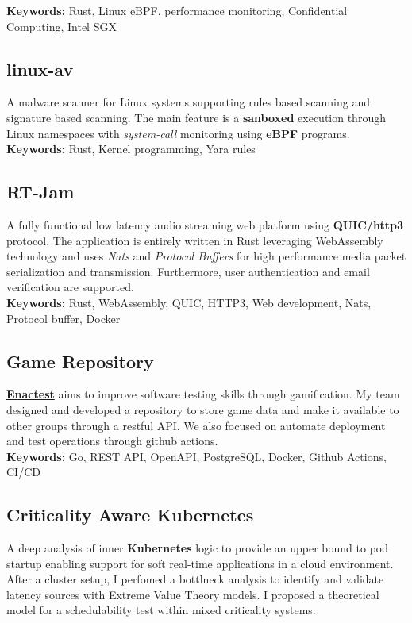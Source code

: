 \documentclass[11pt,a4paper]{article}
\begin{document}
  \textbf{Keywords:} Rust, Linux eBPF, performance monitoring, Confidential Computing, Intel SGX

  \subsection{linux-av \href{https://github.com/alarmfox/linux-av}{\faGithub}}
  A malware scanner for Linux systems supporting rules based scanning and signature based scanning. The main feature is a \textbf{sanboxed} execution through Linux namespaces with \textit{system-call} monitoring using \textbf{eBPF} programs.\\

  \textbf{Keywords:} Rust, Kernel programming, Yara rules 
  
  \subsection{RT-Jam \href{https://github.com/alarmfox/rt-jam}{\faGithub}}
  A fully functional low latency audio streaming web platform using \textbf{QUIC/http3} protocol. The application is entirely written in Rust leveraging WebAssembly technology and uses \textit{Nats} and \textit{Protocol Buffers} for high performance media packet serialization and transmission. Furthermore, user authentication and email verification are supported. \\

  \textbf{Keywords:} Rust, WebAssembly, QUIC, HTTP3, Web development, Nats, Protocol buffer, Docker 
  
  \subsection{Game Repository \href{https://github.com/alarmfox/game-repository}{\faGithub} \href{https://game-repository.capass.org}{\faLaptopCode}}
  \textbf{\href{https://enactest-project.eu/}{Enactest}} aims to improve software testing skills through gamification. My team designed and developed a repository to store game data and make it available to other groups through a restful API. We also focused on automate deployment and test operations through github actions. \\

  \textbf{Keywords:} Go, REST API, OpenAPI, PostgreSQL, Docker, Github Actions, CI/CD 

  \subsection{Criticality Aware Kubernetes \href{https://github.com/alarmfox/criticality-aware-kubernetes}{\faGithub}}
  A deep analysis of inner \textbf{Kubernetes} logic to provide an upper bound to pod startup enabling support for 
  soft real-time applications in a cloud environment. After a cluster setup, I perfomed a bottlneck analysis to identify and validate latency sources with Extreme Value Theory models. I proposed a theoretical model for a schedulability test within mixed criticality systems. \\
\end{document}

